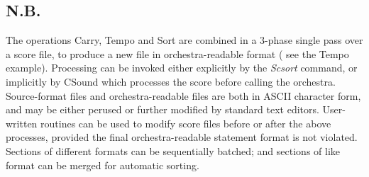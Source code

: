 \subsection*{N.B.}


  The operations Carry, Tempo and Sort are combined in a 3-phase single pass over a score file, to produce a new file in orchestra-readable format ( see the Tempo example). Processing can be invoked either explicitly by the \emph{Scsort}
 command, or implicitly by CSound which processes the score before calling the orchestra. Source-format files and orchestra-readable files are both in ASCII character form, and may be either perused or further modified by standard text editors. User-written routines can be used to modify score files before or after the above processes, provided the final orchestra-readable statement format is not violated. Sections of different formats can be sequentially batched; and sections of like format can be merged for automatic sorting. 


\begin{comment}
\begin{tabular}{lcr}
Previous &Home &Next \\
Zak Patch System &Up &Next-P and Previous-P Symbols

\end{tabular}



\end{comment}
